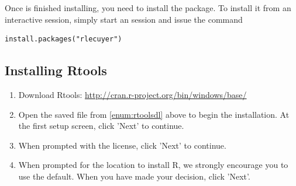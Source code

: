 Once  is finished installing, you need to install the  \href{http://cran.r-project.org/web/packages/rlecuyer/index.html}{} package.  To install it from an interactive  session, simply start an  session and issue the command
\begin{lstlisting}[language=rr]
install.packages("rlecuyer")
\end{lstlisting}





\subsection{Installing Rtools}\label{inst:rtools}

\begin{enumerate}
  \item Download Rtools: \url{http://cran.r-project.org/bin/windows/base/} \label{enum:rtoolsdl}
  \item Open the saved file from \ref{enum:rtoolsdl} above to begin the installation.  At the first setup screen, click 'Next' to continue.
  \item When prompted with the license, click 'Next' to continue.
  \item When prompted for the location to install R, we strongly encourage you to use the default.  When you have made your decision, click 'Next'.

\end{enumerate}

